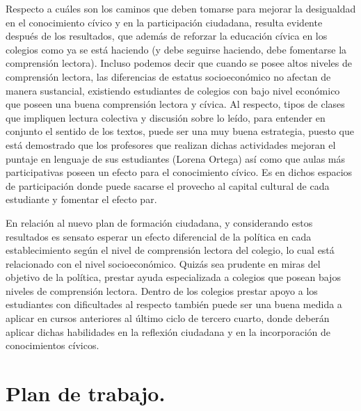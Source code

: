 \documentclass[12pt,twoside]{templates/facsothesis}
\begin{document}
Respecto a cuáles son los caminos que deben tomarse para mejorar la desigualdad en el conocimiento cívico y en la participación ciudadana, resulta evidente después de los resultados, que además de reforzar la educación cívica en los colegios como ya se está haciendo (y debe seguirse haciendo, debe fomentarse la comprensión lectora). Incluso podemos decir que cuando se posee altos niveles de comprensión lectora, las diferencias de estatus socioeconómico no afectan de manera sustancial, existiendo estudiantes de colegios con bajo nivel económico que poseen una buena comprensión lectora y cívica. Al respecto, tipos de clases que impliquen lectura colectiva y discusión sobre lo leído, para entender en conjunto el sentido de los textos, puede ser una muy buena estrategia, puesto que está demostrado que los profesores que realizan dichas actividades mejoran el puntaje en lenguaje de sus estudiantes (Lorena Ortega) así como que aulas más participativas poseen un efecto para el conocimiento cívico. Es en dichos espacios de participación donde puede sacarse el provecho al capital cultural de cada estudiante y fomentar el efecto par.

En relación al nuevo plan de formación ciudadana, y considerando estos resultados es sensato esperar un efecto diferencial de la política en cada establecimiento según el nivel de comprensión lectora del colegio, lo cual está relacionado con el nivel socioeconómico. Quizás sea prudente en miras del objetivo de la política, prestar ayuda especializada a colegios que posean bajos niveles de comprensión lectora. Dentro de los colegios prestar apoyo a los estudiantes con dificultades al respecto también puede ser una buena medida a aplicar en cursos anteriores al último ciclo de tercero cuarto, donde deberán aplicar dichas habilidades en la reflexión ciudadana y en la incorporación de conocimientos cívicos.

\hypertarget{plan-de-trabajo.}{%
\chapter{Plan de trabajo.}\label{plan-de-trabajo.}}
\end{document}
